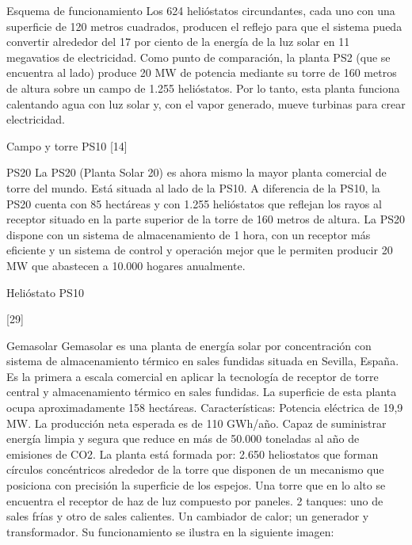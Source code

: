 \documentclass[12pt]{article}
\begin{document}
Esquema de funcionamiento
Los 624 helióstatos circundantes, cada uno con una superficie de 120 metros cuadrados, producen el reflejo para que el sistema pueda convertir alrededor del 17 por ciento de la energía de la luz solar en 11 megavatios de electricidad. Como punto de comparación, la planta PS2 (que se encuentra al lado) produce 20 MW de potencia mediante su torre de 160 metros de altura sobre un campo de 1.255 helióstatos.
Por lo tanto, esta planta funciona calentando agua con luz solar y, con el vapor generado, mueve turbinas para crear electricidad.

Campo y torre PS10
[14]



PS20
La PS20 (Planta Solar 20) es ahora mismo la mayor planta comercial de torre del mundo. Está situada al lado de la PS10.
A diferencia de la PS10, la PS20 cuenta con 85 hectáreas y con 1.255 helióstatos que reflejan los rayos al receptor situado en la parte superior de la torre de 160 metros de altura.
La PS20 dispone con un sistema de almacenamiento de 1 hora, con un receptor más eficiente y un sistema de control y operación mejor que le permiten producir 20 MW que abastecen a 10.000 hogares anualmente.

Helióstato PS10

[29]

Gemasolar
Gemasolar es una planta de energía solar por concentración con sistema de almacenamiento térmico en sales fundidas situada en Sevilla, España. Es la primera a escala comercial en aplicar la tecnología de receptor de torre central y almacenamiento térmico en sales fundidas. La superficie de esta planta ocupa aproximadamente 158 hectáreas. Características:
Potencia eléctrica de 19,9 MW.
La producción neta esperada es de 110 GWh/año.
Capaz de suministrar energía limpia y segura que reduce en más de 50.000 toneladas al año de emisiones de CO2.
La planta está formada por:
2.650 heliostatos que forman círculos concéntricos alrededor de la torre que disponen de un mecanismo que posiciona con precisión la superficie de los espejos.
Una torre que en lo alto se encuentra el receptor de haz de luz compuesto por paneles.
2 tanques: uno de sales frías y otro de sales calientes.
Un cambiador de calor; un generador y transformador.
Su funcionamiento se ilustra en la siguiente imagen:
\end{document}
